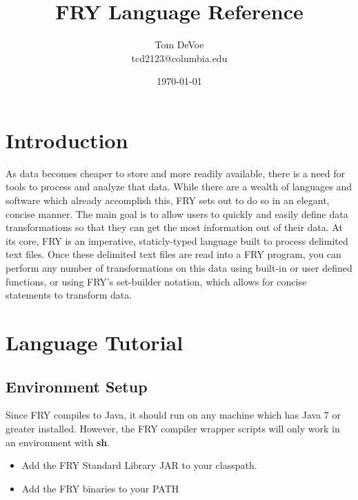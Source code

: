 \documentclass{article}
\title{FRY Language Reference}
\author{Tom DeVoe \\ tcd2123@columbia.edu}
\date{\today}
\begin{document}
\maketitle
\tableofcontents 
{}
\section{Introduction}
As data becomes cheaper to store and more readily available, there is a need for tools to process and analyze that data. While there are a wealth of languages and software which already accomplish this, FRY sets out to do so in an elegant, concise manner. The main goal is to allow users to quickly and easily define data transformations so that they can get the most information out of their data.
At its core, FRY is an imperative, staticly-typed language built to process delimited text files. Once these delimited text files are read into a FRY program, you can perform any number of transformations on this data using built-in or user defined functions, or using FRY's set-builder notation, which allows for concise statements to transform data. 

\section{Language Tutorial}
\subsection{Environment Setup}
Since FRY compiles to Java, it should run on any machine which has Java 7 or greater installed. However, the FRY compiler wrapper scripts will only work in an environment with \textbf{sh}.
\begin{itemize}
\item Add the FRY Standard Library JAR to your classpath. 
\item Add the FRY binaries to your PATH
\end{itemize}
\end{document}
